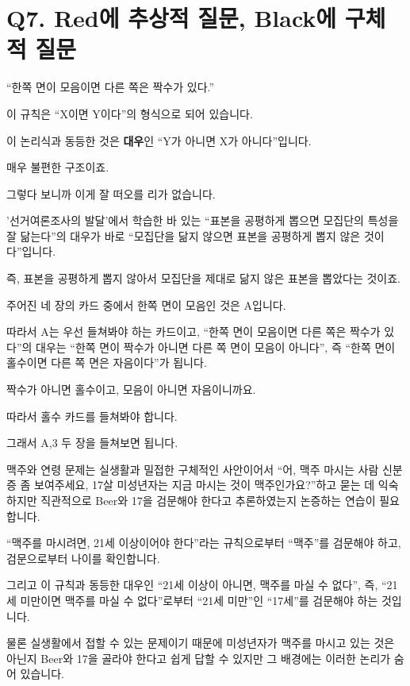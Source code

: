 \documentclass[
]{book}
\begin{document}
\section{Q7. Red에 추상적 질문, Black에 구체적 질문}\label{q7.-reduxc5d0-uxcd94uxc0c1uxc801-uxc9c8uxbb38-blackuxc5d0-uxad6cuxccb4uxc801-uxc9c8uxbb38}

``한쪽 면이 모음이면 다른 쪽은 짝수가 있다.''

이 규칙은 ``X이면 Y이다''의 형식으로 되어 있습니다.

이 논리식과 동등한 것은 \textbf{대우}인 ``Y가 아니면 X가 아니다''입니다.

매우 불편한 구조이죠.

그렇다 보니까 이게 잘 떠오를 리가 없습니다.

'선거여론조사의 발달'에서 학습한 바 있는 ``표본을 공평하게 뽑으면 모집단의 특성을 잘 닮는다''의 대우가 바로 ``모집단을 닮지 않으면 표본을 공평하게 뽑지 않은 것이다''입니다.

즉, 표본을 공평하게 뽑지 않아서 모집단을 제대로 닮지 않은 표본을 뽑았다는 것이죠.

주어진 네 장의 카드 중에서 한쪽 면이 모음인 것은 A입니다.

따라서 A는 우선 들쳐봐야 하는 카드이고, ``한쪽 면이 모음이면 다른 쪽은 짝수가 있다''의 대우는 ``한쪽 면이 짝수가 아니면 다른 쪽 면이 모음이 아니다'', 즉 ``한쪽 면이 홀수이면 다른 쪽 면은 자음이다''가 됩니다.

짝수가 아니면 홀수이고, 모음이 아니면 자음이니까요.

따라서 홀수 카드를 들쳐봐야 합니다.

그래서 A,3 두 장을 들쳐보면 됩니다.

맥주와 연령 문제는 실생활과 밀접한 구체적인 사안이어서 ``어, 맥주 마시는 사람 신분증 좀 보여주세요, 17살 미성년자는 지금 마시는 것이 맥주인가요?''하고 묻는 데 익숙하지만 직관적으로 Beer와 17을 검문해야 한다고 추론하였는지 논증하는 연습이 필요합니다.

``맥주를 마시려면, 21세 이상이어야 한다''라는 규칙으로부터 ``맥주''를 검문해야 하고, 검문으로부터 나이를 확인합니다.

그리고 이 규칙과 동등한 대우인 ``21세 이상이 아니면, 맥주를 마실 수 없다'', 즉, ``21세 미만이면 맥주를 마실 수 없다''로부터 ``21세 미만''인 ``17세''를 검문해야 하는 것입니다.

물론 실생활에서 접할 수 있는 문제이기 때문에 미성년자가 맥주를 마시고 있는 것은 아닌지 Beer와 17을 골라야 한다고 쉽게 답할 수 있지만 그 배경에는 이러한 논리가 숨어 있습니다.
\end{document}
